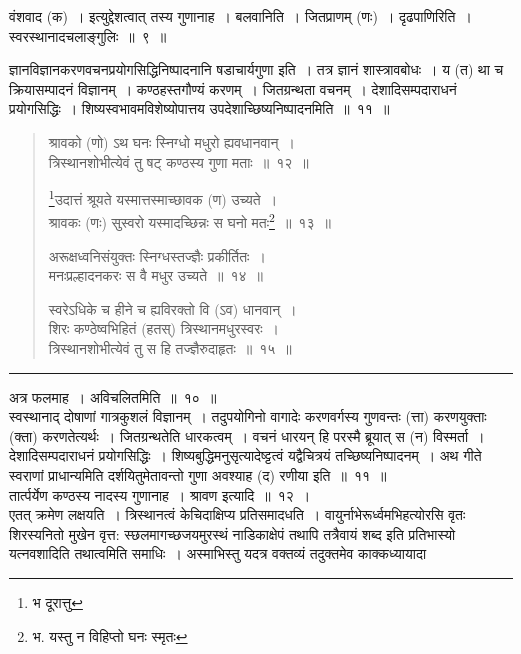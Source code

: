 \documentclass[11pt, openany]{book}
\begin{document}
{\qtt वंशवाद} (क)~। इत्युद्देशत्वात् तस्य गुणानाह~। {\qtt बलवानिति}~। जितप्राणम् (णः)~। {\qtt दृढपाणिरिति}~। स्वरस्थानादचलाङ्गुलिः~॥~९~॥

\newpage
 
{\qt ज्ञानविज्ञानकरणवचनप्रयोगसिद्धिनिष्पादनानि षडाचार्यगुणा इति~। तत्र ज्ञानं शास्त्रावबोधः~। य (त) था च क्रियासम्पादनं विज्ञानम्~। कण्ठहस्तगौण्यं करणम्~। जितग्रन्थता वचनम्~। देशादिसम्पदाराधनं प्रयोगसिद्धिः~। शिष्यस्वभावमविशेष्योपात्तय उपदेशाच्छिष्यनिष्पादनमिति~॥~११~॥}

\begin{quote}
{\na श्रावको (णो) ऽथ घनः स्निग्धो मधुरो ह्यवधानवान्~।\\
 त्रिस्थानशोभीत्येवं तु षट् कण्ठस्य गुणा मताः~॥~१२~॥

 \renewcommand{\thefootnote}{1}\footnote{भ दूरात्तु}उदात्तं श्रूयते यस्मात्तस्माच्छावक (ण) उच्यते~।\\
 श्रावकः (णः) सुस्वरो यस्मादच्छिन्नः स घनो मतः\renewcommand{\thefootnote}{2}\footnote{भ. यस्तु न विहिप्तो घनः स्मृतः}~॥~१३~॥

 अरूक्षध्वनिसंयुक्तः स्निग्धस्तज्ज्ञैः प्रकीर्तितः~।\\
 मनःप्रल्हादनकरः स वै मधुर उच्यते~॥~१४~॥

 स्वरेऽधिके च हीने च ह्यविरक्तो वि (ऽव) धानवान्~।\\
 शिरः कण्ठेष्वभिहितं (हतस्) त्रिस्थानमधुरस्वरः~।\\
 त्रिस्थानशोभीत्येवं तु स हि तज्ज्ञैरुदाहृतः~॥~१५~॥}
\end{quote}

\hrule

\vspace{2mm}
अत्र फलमाह~। {\qtt अविचलितमिति}~॥~१०~॥\\

स्वस्थानाद् दोषाणां गात्रकुशलं {\qtt विज्ञानम्}~। तदुपयोगिनो वागादेः करणवर्गस्य गुणवन्तः (त्ता) करणयुक्ताः (क्ता) करणतेत्यर्थः~। {\qtt जितग्रन्थतेति} धारकत्वम्~। वचनं धारयन् हि परस्मै ब्रूयात् स (न) विस्मर्ता~। देशादिसम्पदाराधनं प्रयोगसिद्धिः~। शिष्यबुद्धिमनुसृत्यादेष्ट्टत्वं यद्वैचित्रयं तच्छिष्यनिष्पादनम्~। अथ गीते स्वराणां प्राधान्यमिति दर्शयितुमेतावन्तो गुणा अवश्याह (द) रणीया इति~॥~११~॥\\

तार्त्पर्येण {\qtt कण्ठस्य} नादस्य गुणानाह~। {\qtt श्रावण} इत्यादि~॥~१२~।\\

एतत् क्रमेण लक्षयति~। त्रिस्थानत्वं केचिदाक्षिप्य प्रतिसमादधति~।  वायुर्नाभेरूर्ध्वमभिहत्योरसि  वृतः शिरस्यनितो मुखेन वृत्त: स्छलमागच्छजयमुरस्थं नाडिकाक्षेपं तथापि तत्रैवायं शब्द इति प्रतिभास्यो यत्नवशादिति तथात्वमिति समाधिः~। अस्माभिस्तु यदत्र वक्तव्यं तदुक्तमेव काक्कध्यायादा 
\end{document}
